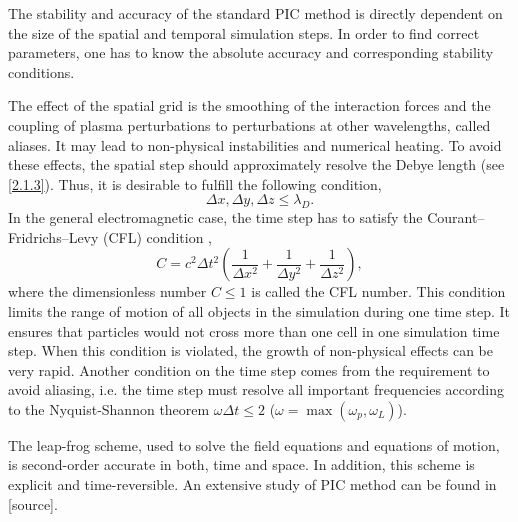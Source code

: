 The stability and accuracy of the standard PIC method is directly dependent on the size of the spatial and temporal simulation steps. In order to find correct parameters, one has to know the absolute accuracy and corresponding stability conditions.

The effect of the spatial grid is the smoothing of the interaction forces and the coupling of plasma perturbations to perturbations at other wavelengths, called aliases. It may lead to non-physical instabilities and numerical heating. To avoid these effects, the spatial step should approximately resolve the Debye length (see \ref{2.1.3}). Thus, it is desirable to fulfill the following condition,
\begin{equation}
\Delta x, \Delta y, \Delta z \leq \lambda_{D}.
\end{equation}
In the general electromagnetic case, the time step has to satisfy the Courant--Fridrichs--Levy (CFL) condition \cite{jaroszynsky},
\begin{equation}
\label{3.1.4.1}
C = c^{2} \Delta t^{2} \left(\frac{1}{\Delta x^{2}} + \frac{1}{\Delta y^{2}} + \frac{1}{\Delta z^{2}}\right),
\end{equation}
where the dimensionless number $ C \leq 1 $ is called the CFL number. This condition limits the range of motion of all objects in the simulation during one time step. It ensures that particles would not cross more than one cell in one simulation time step. When this condition is violated, the growth of non-physical effects can be very rapid. Another condition on the time step comes from the requirement to avoid aliasing, i.e. the time step must resolve all important frequencies according to the Nyquist-Shannon theorem $ \omega \Delta t \leq 2 $ ($ \omega = \max\left( \omega_p, \omega_L \right) $).

The leap-frog scheme, used to solve the field equations and equations of motion, is second-order accurate in both, time and space. In addition, this scheme is explicit and time-reversible. An extensive study of PIC method can be found in [source].